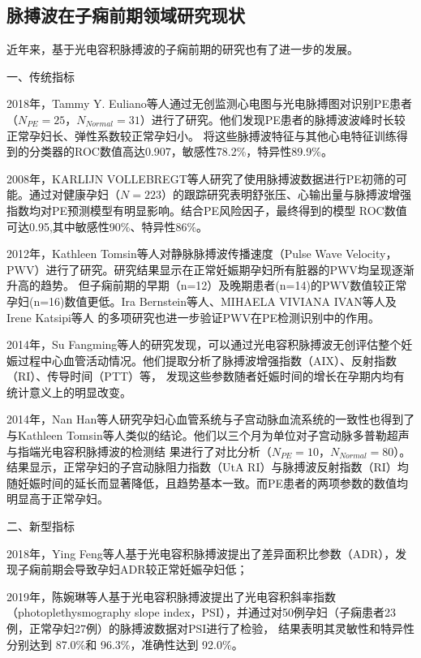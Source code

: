 \subsection{脉搏波在子痫前期领域研究现状}
近年来，基于光电容积脉搏波的子痫前期的研究也有了进一步的发展。

一、传统指标

2018年，Tammy Y. Euliano等人\cite{Euliano2018}通过无创监测心电图与光电脉搏图对识别PE患者（$N_{PE}=25$，$N_{Normal}=31$）进行了研究。他们发现PE患者的脉搏波波峰时长较正常孕妇长、弹性系数较正常孕妇小。
将这些脉搏波特征与其他心电特征训练得到的分类器的ROC数值高达0.907，敏感性78.2\%，特异性89.9\%。

2008年，KARLIJN VOLLEBREGT等人\cite{KARLIJN2008}研究了使用脉搏波数据进行PE初筛的可能。通过对健康孕妇（$N=223$）的跟踪研究表明舒张压、心输出量与脉搏波增强指数均对PE预测模型有明显影响。结合PE风险因子，最终得到的模型
ROC数值可达0.95,其中敏感性90\%、特异性86\%。

2012年，Kathleen Tomsin等人\cite{Tomsin2012}对静脉脉搏波传播速度（Pulse Wave Velocity，PWV）进行了研究。研究结果显示在正常妊娠期孕妇所有脏器的PWV均呈现逐渐升高的趋势。
但子痫前期的早期（n=12）及晚期患者(n=14)的PWV数值较正常孕妇(n=16)数值更低。Ira Bernstein等人\cite{Ira2014}、MIHAELA VIVIANA IVAN等人\cite{VivianaIvan2018}及Irene Katsipi等人\cite{Katsipi2014}
的多项研究也进一步验证PWV在PE检测识别中的作用。

2014年，Su Fangming等人\cite{Su2014}的研究发现，可以通过光电容积脉搏波无创评估整个妊娠过程中心血管活动情况。他们提取分析了脉搏波增强指数（AIX）、反射指数（RI）、传导时间（PTT）等，
发现这些参数随者妊娠时间的增长在孕期内均有统计意义上的明显改变。

2014年，Nan Han等人\cite{Han2014}研究孕妇心血管系统与子宫动脉血流系统的一致性也得到了与Kathleen Tomsin等人\cite{Tomsin2012}类似的结论。他们以三个月为单位对子宫动脉多普勒超声与指端光电容积脉搏波的检测结
果进行了对比分析（$N_{PE}=10$，$N_{Normal}=80$）。结果显示，正常孕妇的子宫动脉阻力指数（UtA RI）与脉搏波反射指数（RI）均随妊娠时间的延长而显著降低，且趋势基本一致。而PE患者的两项参数的数值均明显高于正常孕妇。

二、新型指标

2018年，Ying Feng等人\cite{Feng2018}基于光电容积脉搏波提出了差异面积比参数（ADR），发现子痫前期会导致孕妇ADR较正常妊娠孕妇低；

2019年，陈婉琳等人\cite{Chen2019}基于光电容积脉搏波提出了光电容积斜率指数（photoplethysmography slope index，PSI），并通过对50例孕妇（子痫患者23例，正常孕妇27例）的脉搏波数据对PSI进行了检验，
结果表明其灵敏性和特异性分别达到 87.0\%和 96.3\%，准确性达到 92.0\%。

